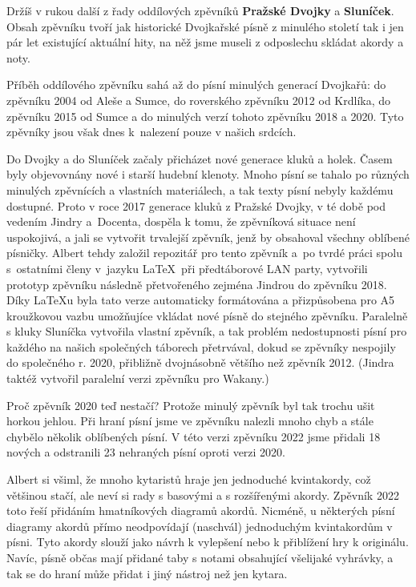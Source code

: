 \normalsize
\sffamily
\lettrine{D}{}ržíš v rukou další z řady oddílových zpěvníků \textbf{Pražské Dvojky} a \textbf{Sluníček}.
Obsah zpěvníku tvoří jak historické Dvojkařské písně z minulého století
tak i jen pár let existující aktuální hity, na něž jsme museli z odposlechu
skládat akordy a noty.

Příběh oddílového zpěvníku sahá až do písní minulých generací Dvojkařů: do
zpěvníku 2004 od Aleše a Sumce, do roverského zpěvníku 2012 od Krdlíka,
do~ zpěvníku 2015 od Sumce a do minulých verzí tohoto zpěvníku
2018 a 2020. Tyto zpěvníky jsou však dnes k~nalezení pouze v našich srdcích.

Do Dvojky a do Sluníček začaly přicházet nové generace kluků a holek.
Časem byly objevovnány nové i starší hudební klenoty.
Mnoho písní se tahalo po různých minulých zpěvnících a vlastních
materiálech, a tak texty písní nebyly každému dostupné.
Proto v roce 2017 generace kluků z Pražské Dvojky, v té době pod vedením Jindry
a~Docenta, dospěla k tomu, že zpěvníková situace není uspokojivá, a jali se
vytvořit trvalejší zpěvník, jenž by obsahoval všechny oblíbené písničky.
Albert tehdy založil
repozitář pro tento zpěvník a~po tvrdé práci spolu s~ostatními členy v~jazyku
\LaTeX \, při předtáborové LAN party, vytvořili prototyp zpěvníku následně
přetvořeného zejména Jindrou do zpěvníku 2018. Díky {\LaTeX}u byla tato verze
automaticky formátována a přizpůsobena pro A5 kroužkovou vazbu umožňujíce
vkládat nové písně do stejného zpěvníku. Paralelně s kluky Sluníčka vytvořila
vlastní zpěvník, a tak problém nedostupnosti písní pro každého na našich
společných táborech přetrvával, dokud se zpěvníky nespojily do společného r.
2020, přibližně dvojnásobně většího než zpěvník 2012. (Jindra taktéž vytvořil
paralelní verzi zpěvníku pro Wakany.)

Proč zpěvník 2020 teď nestačí? Protože minulý zpěvník byl tak trochu ušit
horkou jehlou. Při hraní písní jsme ve zpěvníku nalezli mnoho chyb a stále
chybělo několik oblíbených písní. V této verzi zpěvníku 2022 jsme přidali 18
nových a odstranili 23 nehraných písní oproti verzi 2020.

Albert si všiml, že mnoho kytaristů hraje jen jednoduché kvintakordy, což
většinou stačí, ale neví si rady s basovými a s rozšířenými akordy.
Zpěvník 2022 toto řeší přidáním hmatníkových diagramů akordů.
Nicméně, u některých písní diagramy akordů přímo neodpovídají (naschvál) jednoduchým
kvintakordům v písni. Tyto akordy slouží jako návrh k vylepšení nebo k
přiblížení hry k originálu.
Navíc, písně občas mají přidané taby s notami obsahující všelijaké vyhrávky,
a tak se do hraní může přidat i jiný nástroj než jen kytara.

